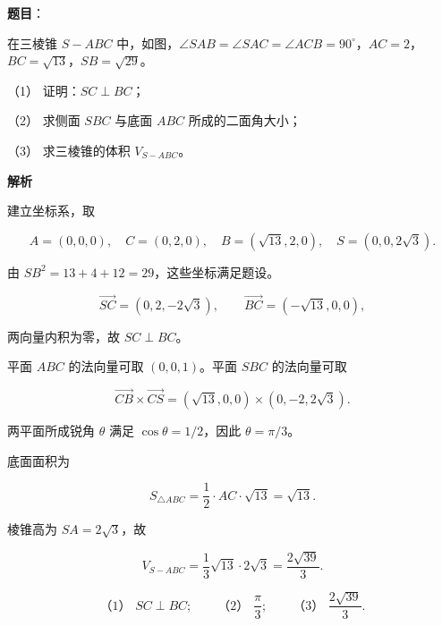 \begin{answer}

\textbf{题目}：

在三棱锥 $S-ABC$ 中，如图，$\angle SAB=\angle SAC=\angle ACB=90^\circ$，$AC=2$，$BC=\sqrt{13}$，$SB=\sqrt{29}$。
\nopagebreak[4]
\begin{center}\end{center}
\nopagebreak[4]
（1） 证明：$SC\perp BC$；

（2） 求侧面 $SBC$ 与底面 $ABC$ 所成的二面角大小；

（3） 求三棱锥的体积 $V_{S-ABC}$。

\textbf{解析}

建立坐标系，取

\nopagebreak[4]
\[
A=(0,0,0),\quad C=(0,2,0),\quad B=(\sqrt{13},2,0),\quad S=(0,0,2\sqrt3).
\]

由 $SB^2=13+4+12=29$，这些坐标满足题设。


\nopagebreak[4]
\[
\overrightarrow{SC}=(0,2,-2\sqrt3),\qquad
\overrightarrow{BC}=(-\sqrt{13},0,0),
\]

两向量内积为零，故 $SC\perp BC$。


平面 $ABC$ 的法向量可取 $(0,0,1)$。平面 $SBC$ 的法向量可取

\nopagebreak[4]
\[
\overrightarrow{CB}\times\overrightarrow{CS}
=(\sqrt{13},0,0)\times(0,-2,2\sqrt3).
\]

两平面所成锐角 $\theta$ 满足 $\cos\theta=1/2$，因此 $\theta=\pi/3$。


底面面积为

\nopagebreak[4]
\[
S_{\triangle ABC}=\frac12\cdot AC\cdot\sqrt{13}=\sqrt{13}.
\]

棱锥高为 $SA=2\sqrt3$，故

\nopagebreak[4]
\[
V_{S-ABC}=\frac13\sqrt{13}\cdot2\sqrt3=\frac{2\sqrt{39}}3.
\]

\nopagebreak[4]
\[
\text{（1） }SC\perp BC;\qquad
\text{（2） }\frac\pi3;\qquad
\text{（3） }\frac{2\sqrt{39}}3.
\]




\end{answer}
